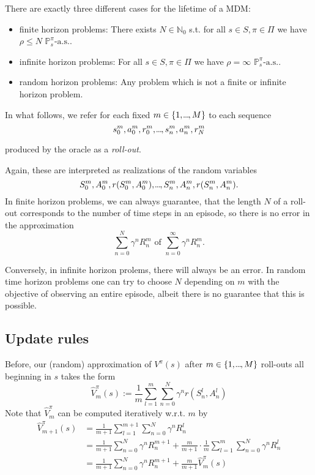 There are exactly three different cases for the lifetime of a MDM:
\begin{itemize}
    \item finite horizon problems: There exists \( N \in \mathbb{N}_{0} \) s.t. for all \( s \in S, \pi \in \Pi \) we have 
    \( \rho \leq N \,\,\mathbb{P}_s^\pi\text{-a.s.}\).
    
    \item infinite horizon problems: For all \( s \in S, \pi \in \Pi \) we have  \( \rho = \infty \,\,\mathbb{P}_s^\pi\text{-a.s.} \).
    
    \item random horizon problems: Any problem which is not a finite or infinite horizon problem.
\end{itemize}

In what follows, we refer for each fixed \( m \in \left\{ 1,\kern-0.10em.\kern-0.06em.\kern-0.06em.\kern-0.1em, M \right\} \) 
 to each sequence 
 \[
     s_{0}^m,a_{0}^m, r_{0}^m,\kern-0.10em.\kern-0.06em.\kern-0.06em.\kern-0.1em,s_n^m,a_n^m, r_N^m
 \]

 produced by the oracle as a \emph{roll-out}. 

 Again, these are interpreted as realizations of the random variables
 \[
     S_{0}^m, A_{0}^m, r(S_{0}^m, A_{0}^m),\kern-0.10em.\kern-0.06em.\kern-0.06em.\kern-0.1em, S_n^m, A_n^m, r(S_n^m, A_n^m).
 \]
In finite horizon problems, we can always guarantee, that the length \( N \) of a roll-out corresponds to the number of time steps in an episode, so there is no error in the approximation
\[
    \sum_{n=0}^N \gamma^n R_n^m \text{ of  } \sum_{n=0}^\infty \gamma^n R_n^m.
\]  
 
Conversely, in infinite horizon prolems, there will always be an error. In random time horizon problems one can try to choose \( N \) depending on \( m \) with the objective of observing an entire episode, albeit there is no guarantee that this is possible.
 
 

 
\subsection*{Update rules}
Before, our (random) approximation of \( V^\pi(s) \) after \( m \in \left\{  1,\kern-0.10em.\kern-0.06em.\kern-0.06em.\kern-0.1em,M \right\}\) roll-outs all beginning in \( s \) takes the form 
\[
    \hat{V}_m^\pi(s) := \frac{1}{m} \sum_{l=1}^m \sum_{n=0}^N \gamma^n r(S_n^l, A_n^l)
\]
Note that \( \hat{V}_m^\pi \) can be computed iteratively w.r.t. \( m \) by 
\begin{align*}
        \hat{V}_{m+1}^\pi(s) &= \frac{1}{m+1} \sum_{l=1}^{m+1} \sum_{n=0}^N \gamma^n R_n^l \\
        &= \frac{1}{m+1} \sum_{n=0}^N \gamma^n R_n^{m+1} + \frac{m}{m+1} \cdot \frac{1}{m} \sum_{l=1}^m \sum_{n=0}^N \gamma^n R_n^l\\
        &= \frac{1}{m+1} \sum_{n=0}^N \gamma^n R_n^{m+1} + \frac{m}{m+1} \hat{V}_m^\pi(s)
\end{align*}
 
